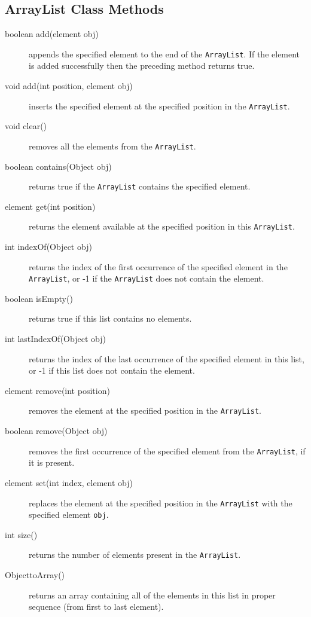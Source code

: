\documentclass[11pt,a4paper]{article}
\begin{document}
\subsection*{ArrayList Class Methods}
\begin{description}
\item [boolean add(element obj)] appends the specified element to the end of the \texttt{ArrayList}. If the element is added successfully then the preceding method returns true.
\item [void add(int position, element obj)] inserts the specified element at the specified position in the \texttt{ArrayList}.
\item [void clear()] removes all the elements from the \texttt{ArrayList}.

\item [boolean contains(Object obj)] returns true if the \texttt{ArrayList} contains the specified element.

\item [element get(int position)] returns the element available at the specified position in this \texttt{ArrayList}.

\item [int indexOf(Object obj)] returns the index of the first occurrence of the specified element in the \texttt{ArrayList}, or -1 if the \texttt{ArrayList} does not contain the element.

\item [boolean isEmpty()] returns true if this list contains no elements.
\item [int lastIndexOf(Object obj)] returns the index of the last occurrence of the specified element in this list, or -1 if this list does not contain the element.
\item [element remove(int position)] removes the element at the specified position in the \texttt{ArrayList}.
\item [boolean remove(Object obj)] removes the first occurrence of the specified element from the \texttt{ArrayList}, if it is present.

\item [element set(int index, element obj)] replaces the element at the specified position in the \texttt{ArrayList} with the specified element \texttt{obj}.
\item [int size()] returns the number of elements present in the \texttt{ArrayList}.

\item [Object\lbrack \rbrack \hspace{.3cm}toArray()] returns an array containing all of the elements in this list in proper sequence (from first to last element).

\end{description}
\end{document}
